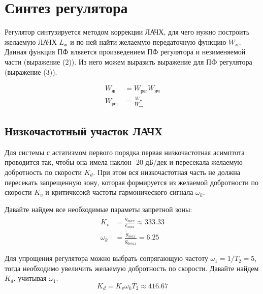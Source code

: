 \documentclass[russian, utf8]{eskdtext}
\begin{document}
\newpage
\section{Синтез регулятора}
Регулятор синтузируется методом коррекции ЛАЧХ, для чего нужно построить желаемую ЛАЧХ $L_\text{ж}$ и по ней найти желаемую передаточную функцию $W_\text{ж}$. Данная функция ПФ ялвяется произведением ПФ регулятора и незименяемой части (выражение (2)). Из него можем выразить выражение для ПФ регулятора (выражение (3)).\par
\begin{align*}
    W_\text{ж} & = W_\text{рег}W_\text{нч} \\
    W_\text{рег} & = \frac{W_\text{ж}}{W_\text{нч}}
\end{align*} \par
\subsection{Низкочастотный участок ЛАЧХ}
Для системы с астатизмом первого порядка первая низкочастотная асимптота проводится так, чтобы она имела наклон -20 дБ/дек и пересекала желаемую добротность по скорости $K_d$. При этом вся низкочастотная часть не должна пересекать запрещенную зону, которая формируется из желаемой добротности по скорости $K_v$ и критичксокй частоты гармонического сигнала $\omega_k$.\par
Давайте найдем все необходимые параметы запретной зоны:
\begin{align*} 
    K_v &= \frac{\dot{g}_{max}}{e_{max}} \approx 333.33 \\
    \omega_k & = \frac{\dot{g}_{max}}{\dot{g}_{0max}} = 6.25
\end{align*} \par

Для упрощения регулятора можно выбрать сопрягающую частоту $\omega_1 = 1/T_2 = 5$, тогда необходимо увеличить желаемую добротность по скорости. Давайте найдем $K_d$, учитывая $\omega_1$.
\begin{equation*}
    K_d = K_v\omega_kT_2 \approx 416.67
\end{equation*}
\end{document}
